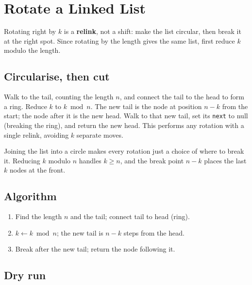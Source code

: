 \section{Rotate a Linked List}
\label{sec:ll-rotate}


\begin{patternbox}
Rotating right by $k$ is a \textbf{relink}, not a shift: make the list
circular, then break it at the right spot. Since rotating by the length
gives the same list, first reduce $k$ modulo the length.
\end{patternbox}

\subsection*{Circularise, then cut}

Walk to the tail, counting the length $n$, and connect the tail to the head
to form a ring. Reduce $k$ to $k \bmod n$. The new tail is the node at
position $n-k$ from the start; the node after it is the new head. Walk to
that new tail, set its \texttt{next} to null (breaking the ring), and return
the new head. This performs any rotation with a single relink, avoiding
$k$ separate moves.

\begin{ideabox}
Joining the list into a circle makes every rotation just a choice of where
to break it. Reducing $k$ modulo $n$ handles $k\ge n$, and the break point
$n-k$ places the last $k$ nodes at the front.
\end{ideabox}

\subsection*{Algorithm}

\begin{enumerate}
  \item Find the length $n$ and the tail; connect tail to head (ring).
  \item $k \gets k \bmod n$; the new tail is $n-k$ steps from the head.
  \item Break after the new tail; return the node following it.
\end{enumerate}

\subsection*{Dry run}

